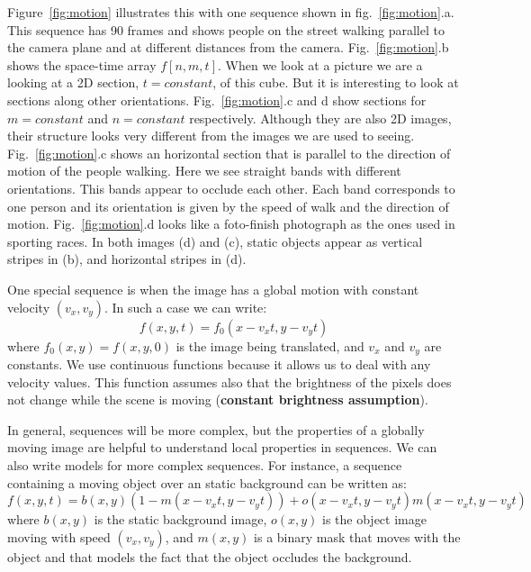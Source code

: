 Figure~\ref{fig:motion} illustrates this with one sequence shown in fig.~\ref{fig:motion}.a. This sequence has 90 frames and shows people on the street walking parallel to the camera plane and at different distances from the camera. Fig.~\ref{fig:motion}.b shows the space-time array $f \left[n,m,t \right]$. When we look at a picture we are a looking at a 2D section, $t=constant$, of this cube. But it is interesting to look at sections along other orientations.  Fig.~\ref{fig:motion}.c and d show sections for $m=constant$ and $n=constant$ respectively. Although they are also 2D images, their structure looks very different from the images we are used to seeing. Fig.~\ref{fig:motion}.c shows an horizontal section that is parallel to the direction of motion of the people walking. Here we see straight bands with different orientations. This bands appear to occlude each other. Each band corresponds to one person and its orientation is given by the speed of walk and the direction of motion. Fig.~\ref{fig:motion}.d looks like a foto-finish photograph as the ones used in sporting races. In both images (d) and (c), static objects appear as vertical stripes in (b), and horizontal stripes in (d). 

One special sequence is when the image has a global motion with constant velocity $(v_x,v_y)$. In such a case we can write:
\begin{equation}
f (x,y,t) = f_0 (x-v_xt,y-v_yt)
\end{equation}
where $f_0(x,y)= f (x,y,0)$ is the image being translated, and $v_x$ and $v_y$ are constants. We use continuous functions because it allows us to deal with any velocity values. This function assumes also that the brightness of the pixels does not change while the scene is moving ({\bf constant brightness assumption}). 


In general, sequences will be more complex, but the properties of a globally moving image are helpful to understand local properties in sequences. We can also write models for more complex sequences. For instance, a sequence containing a moving object over an static background can be written as: 
\begin{equation}
f (x,y,t) = b(x,y) (1-m(x-v_xt,y-v_yt)) + o(x-v_xt,y-v_yt) m(x-v_x t,y-v_y t)
\end{equation}
where $b(x,y)$ is the static background image, $o(x,y)$ is the object image moving with speed $(v_x,v_y)$, and $m(x,y)$ is a binary mask that moves with the object and that models the fact that the object occludes the background. 

